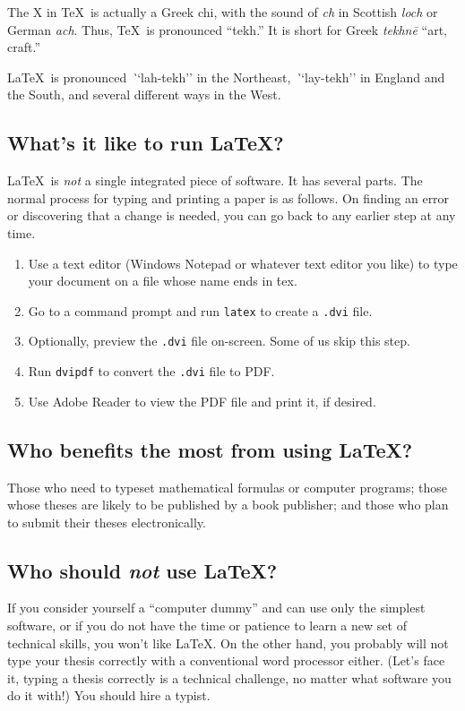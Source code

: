 \documentclass[12pt]{report}
\begin{document}
The X in \TeX\ is actually a Greek chi, with the sound of \emph{ch} in
Scottish \emph{loch} or German \emph{ach}.  Thus, \TeX\ is pronounced
``tekh.''  It is short for Greek \emph{tekhn\={e}} ``art, craft.''

\LaTeX\ is pronounced \emph``lah-tekh'' in the Northeast, \emph``lay-tekh''
in England and the South, and several different ways in the West.

\subsection{What's it like to run \LaTeX?}

\LaTeX\ is \emph{not} a single integrated piece of software.  It has several
parts.  The normal process for typing and printing a paper is as follows.
On finding an error or discovering that a change is needed, you can go back
to any earlier step at any time.
\begin{enumerate}
\item Use a text editor (Windows Notepad or whatever text editor you like)
to type your document on a file whose name ends in {\.tex}.
\item Go to a command prompt and run {\tt latex} to create a {\tt .dvi} file.
\item Optionally, preview the {\tt .dvi} file on-screen.  Some of us skip
this step.
\item Run {\tt dvipdf} to convert the {\tt .dvi} file to PDF.
\item Use Adobe Reader to view the PDF file and print it, if desired.
\end{enumerate}

\subsection{Who benefits the most from using \LaTeX?}

Those who need to typeset mathematical formulas or computer programs;
those whose theses are likely to be published
by a book publisher; and those who plan to submit their theses electronically.

\subsection{Who should \emph{not} use \LaTeX?}

If you consider yourself a ``computer dummy'' and can use only the simplest
software, or if you do not have the time or patience to learn a new set of
technical skills, you won't like \LaTeX.  On the other hand, you probably
will not type your thesis correctly with a conventional word processor
either.  (Let's face it, typing a thesis correctly is a technical challenge,
no matter what software you do it with!)  You should hire a typist.
\end{document}
